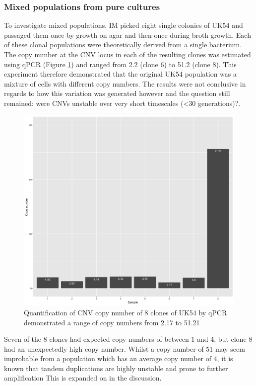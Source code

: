 \documentclass{article}
\begin{document}
\subsubsection{Mixed populations from pure cultures}
To investigate mixed populations, IM picked eight single colonies of UK54 and passaged them once by growth on agar and then once during broth growth. Each of these clonal populations were theoretically derived from a single bacterium. The copy number at the CNV locus in each of the resulting clones was estimated using qPCR (Figure \ref{fig:8_clones}) and ranged from 2.2 (clone 6) to 51.2 (clone 8). This experiment therefore demonstrated that the original UK54 population was a mixture of cells with different copy numbers. The results were not conclusive in regards to how this variation was generated however and the question still remained: were CNVs unstable over very short timescales (<30 generations)?.


\begin{figure}[h!]
\centering
\includegraphics[width=\textwidth{}]{Chapter_2/8 clones.png}
\caption{ Quantification of CNV copy number of 8 clones of UK54 by qPCR demonstrated a range of copy numbers from 2.17 to 51.21}
\label{fig:8_clones}
\end{figure}

Seven of the 8 clones had expected copy numbers of between 1 and 4, but clone 8 had an unexpectedly high copy number. Whilst a copy number of 51 may seem improbable from a population which has an average copy number of 4, it is known that tandem duplications are highly unstable and prone to further amplification This is expanded on in the discussion.
\end{document}
